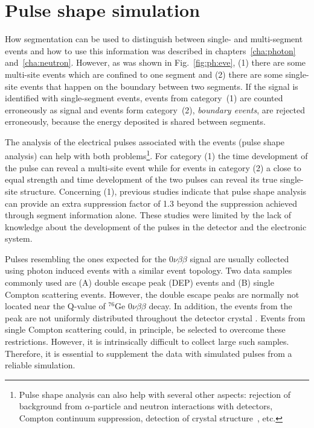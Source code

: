 \chapter{Pulse shape simulation}
\label{cha:pss}
How segmentation can be used to distinguish between single- and
multi-segment events and how to use this information was described in
chapters~\ref{cha:photon} and~\ref{cha:neutron}.  However, as was
shown in Fig.~\ref{fig:ph:eve}, (1) there are some multi-site events
which are confined to one segment and (2) there are some single-site
events that happen on the boundary between two segments. If the
signal is identified with single-segment events, events from
category~(1) are counted erroneously as signal and events form
category~(2), \textit{boundary events}, are rejected erroneously,
because the energy deposited is shared between segments.

The analysis of the electrical pulses associated with the events
(pulse shape analysis) can help with both problems\footnote{Pulse
shape analysis can also help with several other aspects: rejection of
background from $\alpha$-particle and neutron interactions with
detectors, Compton continuum suppression\cite{comcon}, detection of
crystal structure~\cite{agata}, etc.}. For category (1) the time
development of the pulse can reveal a multi-site event while for
events in category (2) a close to equal strength and time development
of the two pulses can reveal its true single-site structure.
Concerning (1), previous studies \cite{Kev07} indicate that pulse
shape analysis can provide an extra suppression factor of 1.3 beyond
the suppression achieved through segment information alone. These
studies were limited by the lack of knowledge about the development of
the pulses in the detector and the electronic system.

Pulses resembling the ones expected for the $0\nu\beta\beta$ signal
are usually collected using photon induced events with a similar event
topology. Two data samples commonly used are (A) double escape peak
(DEP) events and (B) single Compton scattering
events\cite{scoms}. However, the double escape peaks are normally not
located near the Q-value of $^{76}$Ge $0\nu\beta\beta$ decay. In
addition, the events from the peak are not uniformly distributed
throughout the detector crystal \cite{major}.  Events from single
Compton scattering could, in principle, be selected to overcome these
restrictions. However, it is intrinsically difficult to collect large
such samples. Therefore, it is essential to supplement the data with
simulated pulses from a reliable simulation.


